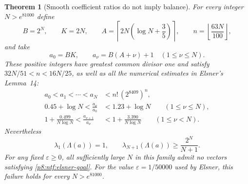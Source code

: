 \documentclass[11pt,a4paper]{article}
\newtheorem{theorem}{Theorem}[section]
\theoremstyle{definition}
\theoremstyle{remark}
\numberwithin{equation}{section}
\begin{document}
\begin{theorem}[Smooth coefficient ratios do not imply balance]
\label{p8:ntf:counterfamily}
For every integer $N>e^{81000}$ define
\[
 B=2^N,\qquad K=2N,\qquad
 A=\left\lceil2N\left(\log N+\frac35\right)\right\rceil,
 \qquad n=\left\lfloor\frac{63N}{100}\right\rfloor,
\]
and take
\begin{equation}\label{p8:ntf:coefficients}
 a_0=BK,\qquad a_\nu=B(A+\nu)+1\quad(1\leq\nu\leq N).
\end{equation}
These positive integers have greatest common divisor one and satisfy
$32N/51<n<16N/25$, as well as all the numerical estimates in
Elsner's Lemma~14:
\begin{align}
 a_0<a_1<\cdots<a_N&<n!\,(2^{8409})^n,
                                      \label{p8:ntf:size}\\
 0.45+\log N<\frac{a_\nu}{a_0}
                &<1.23+\log N\qquad(1\leq\nu\leq N),
                                      \label{p8:ntf:ratio}\\
 1+\frac{0.499}{N\log N}<\frac{a_{\nu+1}}{a_\nu}
                &<1+\frac{3.390}{N\log N}
                         \qquad(1\leq\nu<N).
                                      \label{p8:ntf:successive-ratio}
\end{align}
Nevertheless
\begin{equation}\label{p8:ntf:minima}
 \lambda_1(\Lambda(a))=1,\qquad
 \lambda_{N+1}(\Lambda(a))\geq\frac{2^N}{N+1}.
\end{equation}
For any fixed $\varepsilon\geq0$, all sufficiently large $N$ in
this family admit no vectors satisfying \eqref{p8:ntf:elsner-goal}.
For the value $\varepsilon=1/50000$ used by Elsner, this failure
holds for every $N>e^{81000}$.
\end{theorem}
\end{document}
